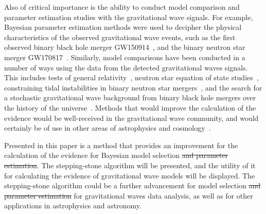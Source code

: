 \documentclass[aps,reprint,amsmath,amssymb,showpacs,showkeys]{revtex4-1}%
\newcommand{\jv}[1]{\textcolor{cyan}{JV: #1}}
\begin{document}
Also of critical importance is the ability to conduct model comparison and parameter estimation studies with the gravitational wave signals. For example, Bayesian parameter estimation methods were used to decipher the physical characteristics of the observed gravitational wave events, such as the first observed binary black hole merger GW150914~\cite{PhysRevLett.116.061102,PhysRevLett.116.241102,PhysRevX.6.041014}, and the binary neutron star merger GW170817~\cite{PhysRevLett.119.161101,Abbott:2018wiz}. Similarly, model comparisons have been conducted in a number of ways using the data from the detected gravitational waves signals. This includes tests of general relativity~\cite{PhysRevLett.116.221101}, neutron star equation of state studies~\cite{PhysRevLett.119.161101,Abbott:2018exr}, constraining tidal instabilities in binary neutron star mergers~\cite{Weinberg:2018icl}, and the search for a stochastic gravitational wave background from binary black hole mergers over the history of the universe~\cite{PhysRevX.8.021019}. Methods that would improve the calculation of the evidence would be well-received in the gravitational wave community, and would certainly be of use in other areas of astrophysics and cosmology~\cite{doi:10.1146/annurev-astro-082214-122339}.


Presented in this paper is a method that provides an improvement for the calculation of the evidence for Bayesian model selection \sout{and parameter estimation}. The stepping-stone algorithm will be presented, and the utility of it for calculating the evidence of gravitational wave models will be displayed. The stepping-stone algorithm could be a further advancement for model selection \sout{and parameter estimation} for gravitational waves data analysis, as well as for other applications in astrophysics and astronomy.%



\end{document}

